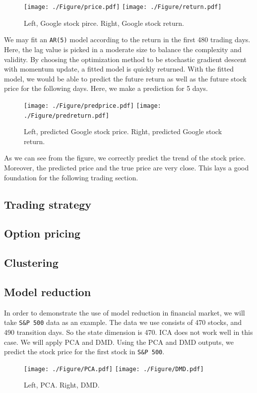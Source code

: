 \documentclass[12pt,a4paper]{article}
\begin{document}
\begin{figure}[H]
        \centering
     \texttt{[image: ./Figure/price.pdf]}
     \texttt{[image: ./Figure/return.pdf]}
\caption{Left, Google stock pirce. Right, Google stock return.}
\end{figure}

We may fit an \texttt{AR(5)}  model according to the return in the first 480 trading days. Here, the lag value is picked in a moderate size to balance the complexity and validity. By choosing the optimization method to be stochastic gradient descent with momentum update, a fitted model is quickly returned. With the fitted model, we would be able to predict the future return as well as the future stock price for the following days. Here, we make a prediction for 5 days.
\begin{figure}[H]
        \centering
     \texttt{[image: ./Figure/predprice.pdf]}
     \texttt{[image: ./Figure/predreturn.pdf]}
\caption{Left, predicted Google stock price. Right, predicted Google stock return.}
\end{figure}
As we can see from the figure, we correctly predict the trend of the stock price. Moreover, the predicted price and the true price are very close. This lays a good foundation for the following trading section.

\subsection{Trading strategy}

\subsection{Option pricing}

\subsection{Clustering}

\subsection{Model reduction}
In order to demonstrate the use of model reduction in financial market, we will take \texttt{S\&P 500} data as an example. The data we use consists of 470 stocks, and 490 transition days. So the state dimension is 470. ICA does not work well in this case. We will apply PCA and DMD. Using the PCA and DMD outputs, we predict the stock price for the first stock in \texttt{S\&P 500}.

\begin{figure}[H]
        \centering
     \texttt{[image: ./Figure/PCA.pdf]}
     \texttt{[image: ./Figure/DMD.pdf]}
\caption{Left, PCA. Right, DMD.}
\end{figure}
\end{document}

